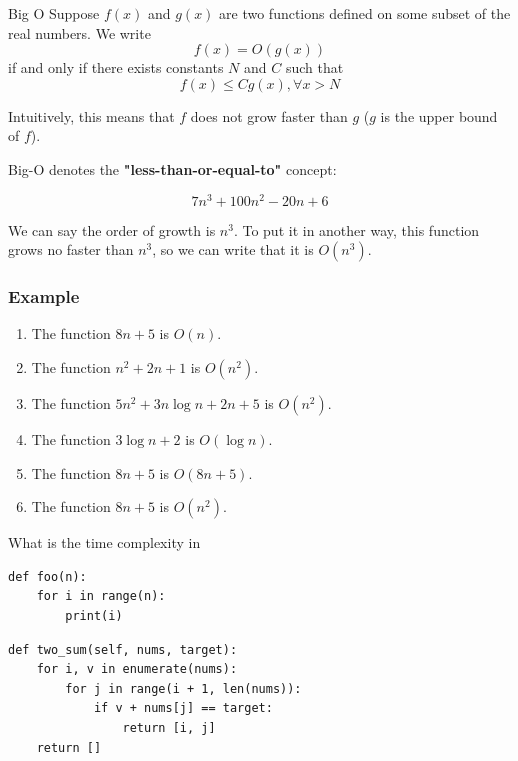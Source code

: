 \documentclass[aspectratio=169, 14pt]{beamer}
\begin{document}
\begin{frame}

	\begin{exampleblock}{Big O}
		Suppose $f(x)$ and $g(x)$ are two functions defined on some subset of the real numbers. We write
		\[f(x) = O(g(x))\]
		if and only if there exists constants $N$ and $C$ such that
		\[f(x) \leq Cg(x), \forall x > N\]
	\end{exampleblock}

	Intuitively, this means that $f$ does not grow faster than $g$ ($g$ is the \alert{upper bound} of $f$).

\end{frame}

\begin{frame}
	Big-O denotes the \textbf{"less-than-or-equal-to"} concept:

	\[7n^3 + 100n^2 - 20n + 6\]

	We can say the order of growth is $n^3$. To put it in another way, this function grows no faster than $n^3$, so we can write that it is $O(n^3)$.
\end{frame}

\begin{frame}[fragile]
	\frametitle{Example}
	\begin{enumerate}
		\item The function $8n + 5$ is $O(n)$.
		\item The function $n^2 + 2n + 1$ is $O(n^2)$.
		\item The function $5n^2 + 3n\log{n} + 2n + 5$ is $O(n^2)$.
		\item The function $3\log{n} + 2$ is $O(\log{n})$.
		\item The function $8n + 5$ is $O(8n + 5)$.
		\item The function $8n + 5$ is $O(n^2)$.
	\end{enumerate}
	\pause

\end{frame}

\begin{frame}[fragile]

	{\large {}} What is the time complexity in 	\begin{verbatim}
def foo(n):
    for i in range(n):
        print(i)
    \end{verbatim}

	\begin{verbatim}
def two_sum(self, nums, target):
    for i, v in enumerate(nums):
        for j in range(i + 1, len(nums)):
            if v + nums[j] == target:
                return [i, j]
    return []
    \end{verbatim}
\end{frame}
\end{document}
